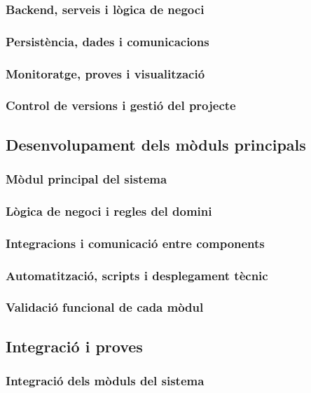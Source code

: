 \documentclass[11pt,a4paper]{article}
\begin{document}
\subsubsection{Backend, serveis i l\`ogica de negoci}
\subsubsection{Persist\`encia, dades i comunicacions}
\subsubsection{Monitoratge, proves i visualitzaci\'o}
\subsubsection{Control de versions i gesti\'o del projecte}

\subsection{Desenvolupament dels m\`oduls principals}
\subsubsection{M\`odul principal del sistema}
\subsubsection{L\`ogica de negoci i regles del domini}
\subsubsection{Integracions i comunicaci\'o entre components}
\subsubsection{Automatitzaci\'o, scripts i desplegament t\`ecnic}
\subsubsection{Validaci\'o funcional de cada m\`odul}

\subsection{Integraci\'o i proves}
\subsubsection{Integraci\'o dels m\`oduls del sistema}
\end{document}
